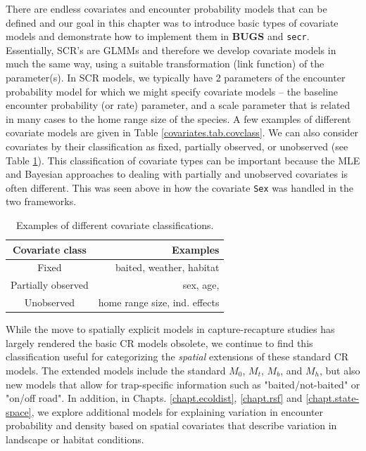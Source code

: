There are endless covariates and encounter probability models that can
be defined and our goal in this chapter was to introduce basic types
of covariate models and demonstrate how to implement them in {\bf
  BUGS} and \mbox{\tt secr}.  Essentially, SCR's are GLMMs and
therefore we develop covariate models in much the same way, using a
suitable transformation (link function) of the parameter(s). In SCR
models, we typically have 2 parameters of the encounter probability
model for which we might specify covariate models -- the baseline
encounter probability (or rate) parameter, and a scale parameter that
is related in many cases to the home range size of the species.  A few
examples of different covariate models are given in Table
\ref{covariates.tab.covclass}.  We can also consider covariates by
their classification as fixed, partially observed, or unobserved (see
Table \ref{covariates.tab.covobs}). This classification of covariate
types can be important because the MLE and Bayesian approaches to
dealing with partially and unobserved covariates is often different.
This was seen above in how the covariate \mbox{\tt Sex} was handled in
the two frameworks.

\begin{table}[ht]
\centering
\caption{Examples of different covariate classifications.}
\begin{tabular}{cr}
\hline \hline
Covariate class & Examples \\
\hline 
Fixed & baited, weather, habitat\\
Partially observed & sex, age, \\
Unobserved &  home range size, ind. effects  \\ \hline
\end{tabular}
\label{covariates.tab.covobs}
\end{table}

While the move to spatially explicit models in capture-recapture
studies has largely rendered the basic CR models
\citep{otis_etal:1978} obsolete, we continue to find this
classification useful for categorizing the {\it spatial} extensions of
these standard CR models.  The extended models include the standard
$M_0$, $M_t$, $M_b$, and $M_h$, but also new models that allow for
trap-specific information such as "baited/not-baited" or "on/off
road".  In addition, in Chapts. \ref{chapt.ecoldist}, \ref{chapt.rsf}
and \ref{chapt.state-space}, we explore additional models for
explaining variation in encounter probability and density based on
spatial covariates that describe variation in landscape or habitat
conditions.

